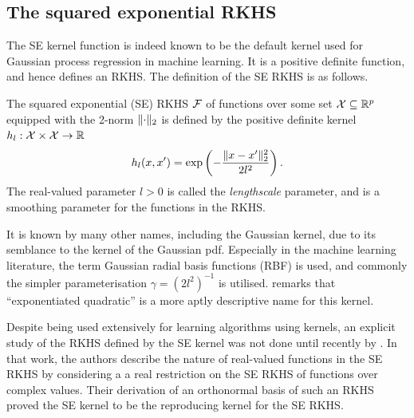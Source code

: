 \subsection{The squared exponential RKHS}

The \gls*{SE} kernel function is indeed known to be the default kernel used for Gaussian process regression in machine learning.
It is a positive definite function, and hence defines an RKHS.
The definition of the \gls*{SE} RKHS is as follows.

\begin{definition}
  The squared exponential (SE) RKHS ${\mathcal F}$ of functions over some set ${\mathcal X} \subseteq \mathbb{R}^p$ equipped with the 2-norm $\lVert\cdot\rVert_2$ is defined by the positive definite kernel $h_l:{\mathcal X}\times{\mathcal X}\to\mathbb{R}$ 
  \[
    h_l(x,x') = \exp\left( -\frac{\lVert x-x'\rVert_2^2}{2l^2} \right).
  \]
  The real-valued parameter $l > 0$ is called the \emph{lengthscale} parameter, and is a smoothing parameter for the functions in the RKHS.
\end{definition}

It is known by many other names, including the Gaussian kernel, due to its semblance to the kernel of the Gaussian pdf. 
Especially in the machine learning literature, the term Gaussian radial basis functions (RBF) is used, and commonly the simpler parameterisation $\gamma = (2l^2)^{-1}$ is utilised.
\citet{duvenaud2014automatic} remarks that ``exponentiated quadratic'' is a more aptly descriptive name for this kernel.

Despite being used extensively for learning algorithms using kernels, an explicit study of the RKHS defined by the SE kernel was not done until recently by \citet{steinwart2006explicit}.
In that work, the authors describe the nature of real-valued functions in the SE RKHS by considering a a real restriction on the SE RKHS of functions over complex values.
Their derivation of an orthonormal basis of such an RKHS proved the SE kernel to be the reproducing kernel for the SE RKHS.

